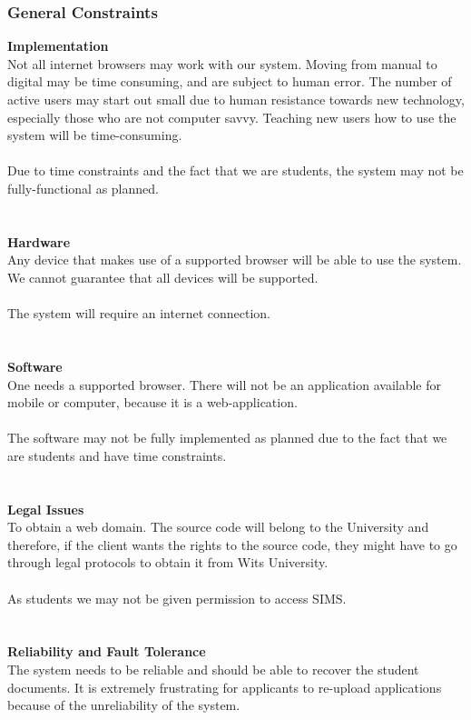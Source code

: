 \documentclass{article}
\begin{document}
\subsubsection{General Constraints}
\textbf{Implementation} \\ 
Not all internet browsers may work with our system. Moving from manual to digital may be time consuming, and are subject to human error. The number of active users may start out small due to human resistance towards new technology, especially those who are not computer savvy. Teaching new users how to use the system will be time-consuming. \\ \\
Due to time constraints and the fact that we are students, the system may not be fully-functional as planned. \\ \\ \\
\textbf{Hardware} \\
Any device that makes use of a supported browser will be able to use the system. We cannot guarantee that all devices will be supported. \\ \\
The system will require an internet connection. \\ \\ \\
\textbf{Software}\\
One needs a supported browser. There will not be an application available for mobile or computer, because it is a web-application. \\ \\
The software may not be fully implemented as planned due to the fact that we are students and have time constraints. \\ \\ \\
\textbf{Legal Issues} \\
To obtain a web domain. The source code will belong to the University and therefore, if the client wants the rights to the source code, they might have to go through legal protocols to obtain it from Wits University. \\ \\
As students we may not be given permission to access SIMS. \\ \\ \\
\textbf{Reliability and Fault Tolerance} \\
The system needs to be reliable and should be able to recover the student documents. It is extremely frustrating for applicants to re-upload applications because of the unreliability of the system.  \\ \\
\end{document}
